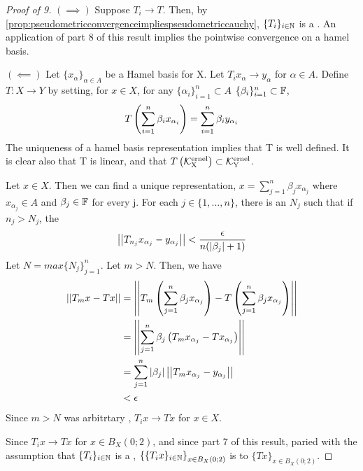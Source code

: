 \begin{prop}
\begin{proof}[Proof of 9]
    $(\implies)$ 
    Suppose $T_i \to T$.
    Then, by \ref{prop:pseudometricconvergenceimpliespseudometriccauchy}, 
    $\{T_i\}_{i \in \mathbb{N}}$ is a \PseudometricCauchySequence.
    An application of part 8 of this result implies
    the pointwise convergence on a hamel basis. 


    $(\impliedby)$
    Let $\{x_\alpha\}_{\alpha \in A}$ be a Hamel basis for X. 
    Let $T_ix_\alpha \to y_\alpha$ for $\alpha \in A$. 
    Define $T: X \to Y$ by setting, for $x \in X$, 
    for any $\{\alpha_i\}_{i=1}^n \subset A$
    $\{\beta_i\}_{i=1}^n \subset \mathbb{F}$, 
    \begin{equation}
    T\left( \sum_{i=1}^n \beta_i x_{\alpha_i}\right) = \sum_{i=1}^n \beta_i y_{\alpha_i}
    \end{equation}
    The uniqueness of a hamel basis representation implies
    that T is well defined. 
    It is clear also that T is linear, 
    and that $T\left( \bf\mathcal{K}\rm^{ernel}_X\right) \subset \bf\mathcal{K}\rm^{ernel}_Y$. 

    Let $x \in X$. 
    Then we can find a unique representation, 
    $x=\sum_{j=1}^n \beta_j x_{\alpha_j}$ where $x_{\alpha_j} \in A$ and $\beta_j \in \mathbb{F}$ for every j. 
    For each $j \in \{1, ..., n\}$, there is an $N_j$ such that if
    $n_j > N_j$, the 
    \begin{equation}
    \left|\left| T_{n_j} x_{\alpha_j} -y_{\alpha_j} \right|\right| < \frac{\epsilon}{n(\left| \beta_j \right|+1)}
    \end{equation}
    Let $N=max\{N_j\}_{j=1}^n$. 
    Let $m>N$. 
    Then, we have 
    \begin{align*}
        \left|\left| T_mx-Tx \right|\right| & = \left|\left| T_m\left( \sum_{j=1}^n \beta_j x_{\alpha_j}\right)-T\left( \sum_{j=1}^n \beta_j x_{\alpha_j}\right) \right|\right|\\
        & = \left|\left| \sum_{j=1}^n \beta_j \left( T_mx_{\alpha_j}-Tx_{\alpha_j}\right) \right|\right|\\
        & = \sum_{j=1}^n \left| \beta_j \right| \left|\left| T_mx_{\alpha_j}-y_{\alpha_j} \right|\right|\\
        & < \epsilon 
    \end{align*}
    Since $m>N$ was arbitrtary , 
    $T_ix \to Tx$ for $x \in X$. 

    Since $T_ix \to Tx$ for $x \in B_X(0;2)$, 
    and since part 7 of this result, 
    paried with the assumption that
    $\{T_i\}_{i \in \mathbb{N}}$ is a \PseudometricCauchySequence, 
    $\left\{\{T_ix\}_{i \in \mathbb{N}}\right\}_{x \in B_X(0;2)}$ 
    is \UniformlyConvergent
    to $\{Tx\}_{x \in B_X(0;2)}$. 


\end{proof}
\end{prop}

